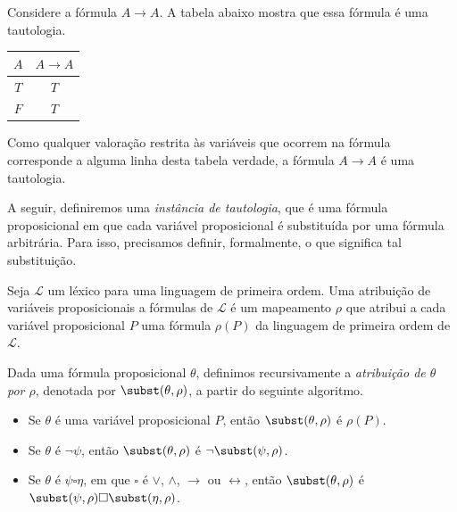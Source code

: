 \begin{example}\label{exa:tautologiaPorTabelaVerdade}
    Considere a fórmula $A\rightarrow A$.
    A tabela abaixo mostra que essa fórmula é uma tautologia.
    \begin{center}
        \begin{tabular}{c|c}
            $A$ & $A\rightarrow A$ \\
            \hline
            $T$ & $T$ \\
            $F$ & $T$
        \end{tabular}
    \end{center}

Como qualquer valoração restrita às variáveis que ocorrem na fórmula corresponde a alguma linha desta tabela verdade, a fórmula $A\rightarrow A$ é uma tautologia.
\end{example}

A seguir, definiremos uma \emph{instância de tautologia}, que é uma fórmula proposicional em que cada variável proposicional é substituída por uma fórmula arbitrária.
Para isso, precisamos definir, formalmente, o que significa tal substituição.

\begin{metaproposition}\label{mprop:substituicaoProposicional}
    Seja $\mathcal L$ um léxico para uma linguagem de primeira ordem.
    Uma atribuição de variáveis proposicionais a fórmulas de $\mathcal L$ é um mapeamento $\rho$ que atribui a cada variável proposicional $P$ uma fórmula $\rho(P)$ da linguagem de primeira ordem de $\mathcal L$.

    Dada uma fórmula proposicional $\theta$, definimos recursivamente a \emph{atribuição de $\theta$ por $\rho$}, denotada por $\subst(\theta, \rho)$, a partir do seguinte algoritmo.

    \begin{itemize}
        \item Se $\theta$ é uma variável proposicional $P$, então $\subst(\theta, \rho)$ é $\rho(P)$.
        \item Se $\theta$ é $\neg \psi$, então $\subst(\theta, \rho)$ é $\neg \subst(\psi, \rho)$.
        \item Se $\theta$ é $ \psi \square \eta$, em que $\square$ é $\vee$, $\wedge$, $\rightarrow$ ou $\leftrightarrow$, então $\subst(\theta, \rho)$ é $\subst(\psi, \rho) \square \subst(\eta, \rho)$.
    \end{itemize}
\end{metaproposition}

